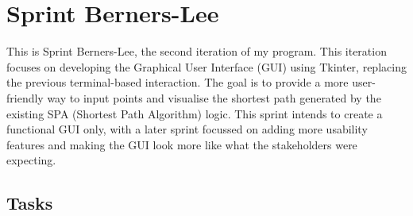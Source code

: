 \clearpage


\section{Sprint Berners-Lee}

This is Sprint Berners-Lee, the second iteration of my program. This iteration focuses on developing the Graphical User Interface (GUI) using Tkinter, replacing the previous terminal-based interaction. The goal is to provide a more user-friendly way to input points and visualise the shortest path generated by the existing SPA (Shortest Path Algorithm) logic. This sprint intends to create a functional GUI only, with a later sprint focussed on adding more usability features and making the GUI look more like what the stakeholders were expecting.

\subsection{Tasks}

